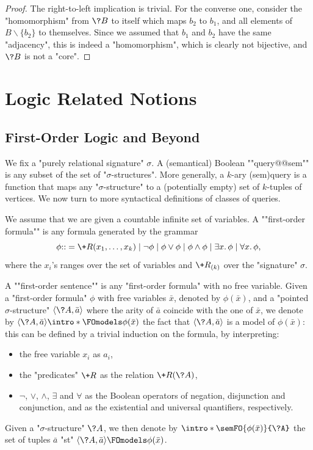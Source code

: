 \begin{proof}
	The right-to-left implication is trivial.
	For the converse one, consider the "homomorphism" from $\?B$ to itself
	which maps $b_2$ to $b_1$, and all elements of $B \smallsetminus \{b_2\}$
	to themselves. Since we assumed that $b_1$ and $b_2$ have the same "adjacency",
	this is indeed a "homomorphism", which is clearly not bijective, and
	$\?B$ is not a "core".
\end{proof}

\section{Logic Related Notions}

\subsection{First-Order Logic and Beyond}

We fix a "purely relational signature" $\sigma$.
A (semantical) Boolean \AP""query@@sem"" is any subset of the
set of "$\sigma$-structures".
More generally, a $k$-ary \reintro(sem){query} is a function
that maps any "$\sigma$-structure" to a (potentially empty) set of $k$-tuples
of vertices.
We now turn to more syntactical definitions of classes of queries.

We assume that we are given a countable infinite set of variables.
A \AP""first-order formula"" is any formula generated by the grammar 
\[
	\phi {:}{:}= \+R(x_1,\hdots,x_k) \mid \neg \phi \mid \phi \lor \phi \mid \phi \land \phi
	\mid \exists x.\, \phi \mid \forall x.\, \phi,
\]
where the $x_i$'s ranges over the set of variables and $\+R_{(k)}$ over the "signature" $\sigma$.


A \AP""first-order sentence"" is any "first-order formula" with no free variable.
Given a "first-order formula" $\phi$ with free variables $\bar x$, denoted by $\phi(\bar x)$,
and a "pointed $\sigma$-structure" $\tup{\?A,\bar a}$ where the arity of $\bar a$ coincide with
the one of $\bar x$, we denote by $\tup{\?A,\bar a} \intro*\FOmodels \phi(\bar x)$
the fact that $\tup{\?A,\bar a}$ is a model of $\phi(\bar x)$: this can be defined by
a trivial induction on the formula, by interpreting:
\begin{itemize}
	\item the free variable $x_i$ as $a_i$,
	\item the "predicates" $\+R$ as the relation $\+R(\?A)$,
	\item $\neg$, $\lor$, $\land$, $\exists$ and $\forall$ as the Boolean operators of negation, disjunction and conjunction, and as the existential and universal quantifiers, respectively.
\end{itemize}
Given a "$\sigma$-structure" $\?A$, we then denote by \AP$\intro*\semFO{\phi(\bar x)}{\?A}$
the set of tuples $\bar a$ "st" $\tup{\?A, \bar a} \FOmodels \phi(\bar x)$.

